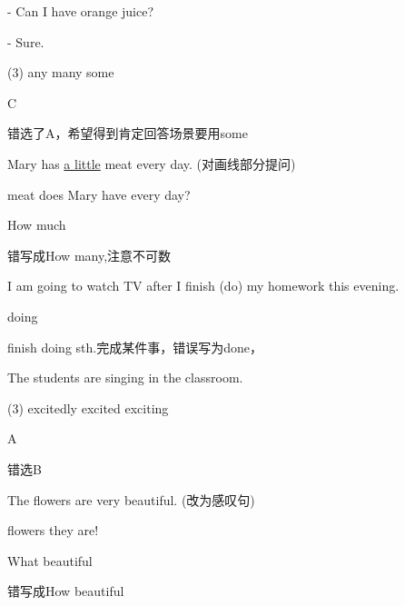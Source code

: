 \begin{question}[tags={xiaoxuect}]
- Can I have \blank[width=1cm]{} orange juice?

\noindent - Sure.

  \begin{tasks}(3)
    \task any
    \task many
    \task some
  \end{tasks}

\end{question}
\begin{solution}
C

错选了A，希望得到肯定回答场景要用some
\end{solution}

\begin{question}[tags={xiaoxuect}]
Mary has \underline{a little} meat every day. (对画线部分提问)

\noindent \blank*[width=2cm]{} \blank*[width=2cm]{} meat does Mary have every day?

\end{question}
\begin{solution}
How much

错写成How many,注意不可数
\end{solution}

\begin{question}[tags={xiaoxuect}]
I am going to watch TV after I finish \blank[width=1.5cm]{}(do) my homework this evening.
\end{question}
\begin{solution}
doing

finish doing sth.完成某件事，错误写为done，
\end{solution}

\begin{question}[tags={xiaoxuect}]
The students are singing \blank[width=1.0cm]{} in the classroom.

  \begin{tasks}(3)
    \task excitedly
    \task excited
    \task exciting
  \end{tasks}
\end{question}
\begin{solution}
A

错选B
\end{solution}

\begin{question}[tags={xiaoxuect}]
The flowers are very beautiful. (改为感叹句)

\noindent \blank*[width=1.9cm]{} \blank*[width=1.9cm]{} flowers they are!
\end{question}
\begin{solution}
What beautiful

错写成How beautiful
\end{solution}